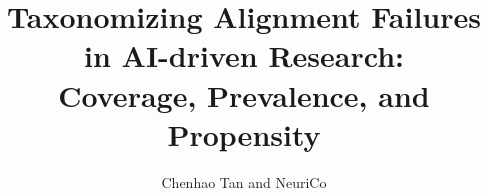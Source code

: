 \documentclass{article}
\title{Taxonomizing Alignment Failures in AI-driven Research:\\Coverage, Prevalence, and Propensity}
\author{Chenhao Tan and NeuriCo}
\begin{document}
\maketitle

\begin{abstract}

\end{abstract}









\end{document}
